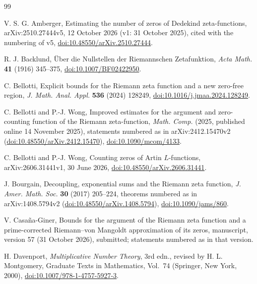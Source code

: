 \documentclass[11pt,reqno]{amsart}
\numberwithin{equation}{section}
\theoremstyle{definition}
\theoremstyle{remark}
\begin{document}
\begin{thebibliography}{99}

 V. S. G. Amberger, Estimating the number of zeros of Dedekind zeta-functions, arXiv:2510.27444v5, 12 October 2026 (v1: 31 October 2025), cited with the numbering of v5, \href{https://doi.org/10.48550/arXiv.2510.27444}{doi:10.48550/arXiv.2510.27444}.

 R. J. Backlund, \"Uber die Nullstellen der Riemannschen Zetafunktion, \textit{Acta Math.} \textbf{41} (1916) 345--375, \href{https://doi.org/10.1007/BF02422950}{doi:10.1007/BF02422950}.

 C. Bellotti, Explicit bounds for the Riemann zeta function and a new zero-free region, \textit{J. Math. Anal. Appl.} \textbf{536} (2024) 128249, \href{https://doi.org/10.1016/j.jmaa.2024.128249}{doi:10.1016/j.jmaa.2024.128249}.

 C. Bellotti and P.-J. Wong, Improved estimates for the argument and zero-counting function of the Riemann zeta-function, \textit{Math. Comp.} (2025, published online 14 November 2025), statements numbered as in arXiv:2412.15470v2 (\href{https://doi.org/10.48550/arXiv.2412.15470}{doi:10.48550/arXiv.2412.15470}), \href{https://doi.org/10.1090/mcom/4133}{doi:10.1090/mcom/4133}.

 C. Bellotti and P.-J. Wong, Counting zeros of Artin $L$-functions, arXiv:2606.31441v1, 30 June 2026, \href{https://doi.org/10.48550/arXiv.2606.31441}{doi:10.48550/arXiv.2606.31441}.

 J. Bourgain, Decoupling, exponential sums and the Riemann zeta function, \textit{J. Amer. Math. Soc.} \textbf{30} (2017) 205--224, theorems numbered as in arXiv:1408.5794v2 (\href{https://doi.org/10.48550/arXiv.1408.5794}{doi:10.48550/arXiv.1408.5794}), \href{https://doi.org/10.1090/jams/860}{doi:10.1090/jams/860}.

 V. Casa\~na-Giner, Bounds for the argument of the Riemann zeta function and a prime-corrected Riemann--von Mangoldt approximation of its zeros, manuscript, version 57 (31 October 2026), submitted; statements numbered as in that version.

 H. Davenport, \textit{Multiplicative Number Theory}, 3rd edn., revised by H. L. Montgomery, Graduate Texts in Mathematics, Vol.~74 (Springer, New York, 2000), \href{https://doi.org/10.1007/978-1-4757-5927-3}{doi:10.1007/978-1-4757-5927-3}.


\end{thebibliography}
\end{document}

